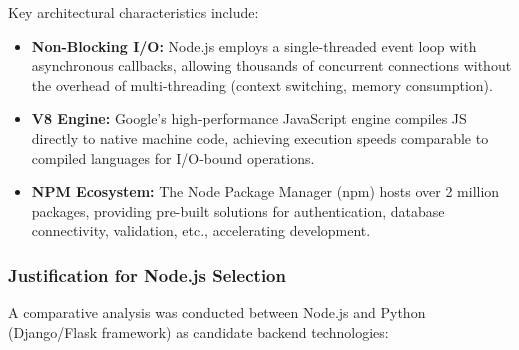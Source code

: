 Key architectural characteristics include:

\begin{itemize}
    \item \textbf{Non-Blocking I/O:} Node.js employs a single-threaded event loop with asynchronous callbacks, allowing thousands of concurrent connections without the overhead of multi-threading (context switching, memory consumption).
    
    \item \textbf{V8 Engine:} Google's high-performance JavaScript engine compiles JS directly to native machine code, achieving execution speeds comparable to compiled languages for I/O-bound operations.
    
    \item \textbf{NPM Ecosystem:} The Node Package Manager (npm) hosts over 2 million packages, providing pre-built solutions for authentication, database connectivity, validation, etc., accelerating development.
\end{itemize}

\subsubsection{Justification for Node.js Selection}

A comparative analysis was conducted between Node.js and Python (Django/Flask framework) as candidate backend technologies:


